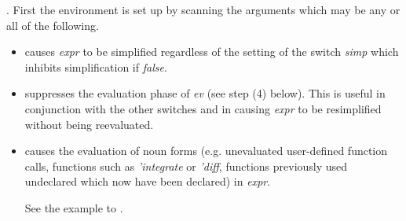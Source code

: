 \documentclass[../Maxima_Workbook.tex]{subfiles}
\begin{document}
. First the environment is set up by scanning the arguments which may be any or all of the following.

\begin{itemize}
	\item {} causes \emph{expr} to be simplified regardless of the setting of the switch \emph{simp} which inhibits simplification if \emph{false}.
	\item {} suppresses the evaluation phase of \emph{ev} (see step (4) below). This is useful in conjunction with the other switches and in causing \emph{expr} to be resimplified without being reevaluated.
	\item {} causes the evaluation of noun forms (e.g. unevaluated user-defined function calls, functions such as \emph{'integrate} or \emph{'diff}, functions previously used undeclared which now have been declared) in \emph{expr}.
	
	\lz See the example to .
	

\end{itemize}
\end{document}
